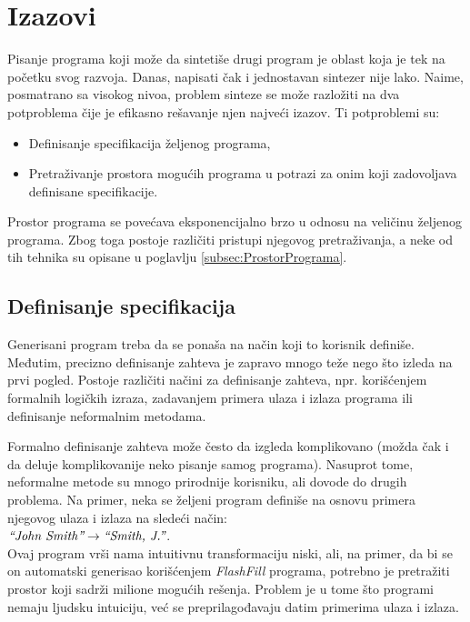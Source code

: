 \section{Izazovi}
\label{sec:Izazovi}

Pisanje programa koji može da sintetiše drugi program je oblast koja je tek na početku svog razvoja. Danas, napisati čak i jednostavan sintezer nije lako. Naime, posmatrano sa visokog nivoa, problem sinteze se može razložiti na dva potproblema čije je efikasno rešavanje njen najveći izazov. Ti potproblemi su:

\begin{itemize}
    \item Definisanje specifikacija željenog programa,
    \item Pretraživanje prostora mogućih programa u potrazi za onim koji zadovoljava definisane specifikacije.
\end{itemize}

Prostor programa se povećava eksponencijalno brzo u odnosu na ve\-li\-či\-nu željenog programa. Zbog toga postoje različiti pristupi njegovog pretraživanja, a neke od tih tehnika su opisane u poglavlju \ref{subsec:ProstorPrograma}.

\subsection{Definisanje specifikacija}
\label{subsec:DefinisanjeSpecifikacija}

Generisani program treba da se ponaša na način koji to korisnik definiše. Međutim, precizno definisanje zahteva je zapravo mnogo teže nego što izleda na prvi pogled. Postoje različiti načini za definisanje zahteva, npr. korišćenjem formalnih logičkih izraza, zadavanjem primera ulaza i izlaza programa ili definisanje neformalnim metodama.

Formalno definisanje zahteva može često da izgleda ko\-mpli\-ko\-va\-no (mo\-žda čak i da deluje komplikovanije neko pisanje samog programa). Nasuprot tome, neformalne metode su mnogo prirodnije korisniku, ali dovode do drugih problema. Na primer, neka se željeni program definiše na osnovu primera njegovog ulaza i izlaza na sledeći način: \\
\(\emph{“John Smith”} \rightarrow \emph{“Smith, J.”}\).\\
Ovaj program vrši nama intuitivnu transformaciju niski, ali, na primer, da bi se on automatski generisao korišćenjem \emph{FlashFill} \cite{FlashFill} programa, potrebno je pretražiti prostor koji sadrži milione mogućih rešenja. Problem je u tome što programi nemaju ljudsku intuiciju, već se pre\-pri\-la\-go\-đa\-va\-ju datim primerima ulaza i izlaza.

